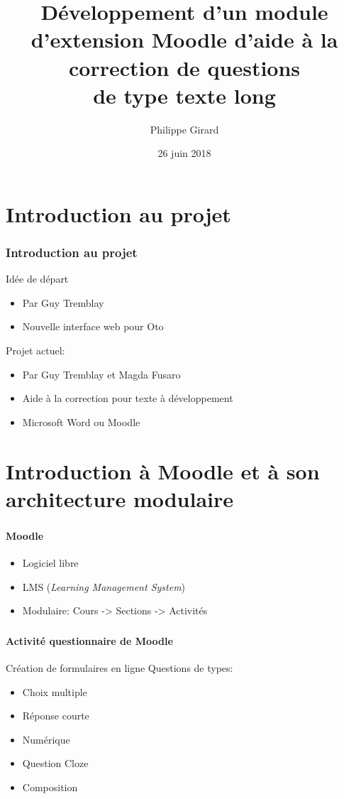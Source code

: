 \documentclass{beamer}
\title[Pr\'esentation du projet de ma\^itrise]{D\'eveloppement d'un module d'extension Moodle d'aide \`a la correction de questions\\de type \og texte long \fg{} }
\author{Philippe Girard}
\institute{Universit\'e du Qu\'ebec \`a Montr\'eal}
\date{26 juin 2018}
\begin{document}
  \begin{frame}[plain]
  \titlepage
  \end{frame}
  
  \begin{frame}[plain]
  \tableofcontents[hideallsubsections]
  \end{frame}
  
  \section[Introduction]{Introduction au projet}
  \begin{frame}
  \frametitle{Introduction au projet}
  
  Id\'ee de d\'epart
  \begin{itemize}
    \item Par Guy Tremblay
    \item Nouvelle interface web pour Oto
  \end{itemize}
  
  \medskip
  
  Projet actuel:
  \begin{itemize}
    \item Par Guy Tremblay et Magda Fusaro
    \item Aide \`a la correction pour texte \`a d\'eveloppement
    \item Microsoft Word ou Moodle
  \end{itemize}
  \end{frame}
  
  \section[Moodle]{Introduction \`a Moodle et \`a son architecture modulaire}
  \begin{frame}
  \frametitle{\insertsection}
  \framesubtitle{Moodle}
  \begin{itemize}
    \item Logiciel libre
    \item LMS (\textit{Learning Management System})
    \item Modulaire: Cours -> Sections -> Activit\'es
  \end{itemize}
  \end{frame}
  
  \begin{frame}
  \frametitle{\insertsection}
  \framesubtitle{Activit\'e questionnaire de Moodle}
  Cr\'eation de formulaires en ligne
  \medskip
  Questions de types:
  \begin{itemize}
    \item Choix multiple
    \item R\'eponse courte
    \item Num\'erique
    \item Question Cloze
    \item Composition
  \end{itemize}
  \end{frame}
  
\end{document}
